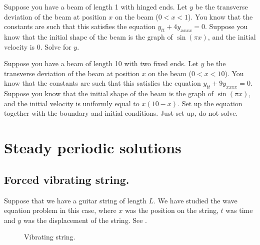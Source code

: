 \documentclass[12pt]{book}
\begin{document}
\setcounter{exercise}{100}

\begin{exercise}
Suppose you have a beam of length 1 with hinged ends.  Let $y$ be the
transverse deviation of the beam at position $x$ on the beam ($0 < x < 1$).
You know that the
constants are such that this satisfies the equation $y_{tt} + 4 y_{xxxx} =
0$.   Suppose you know that the initial shape of the beam is the graph of
$\sin (\pi x)$, and the initial velocity is 0.  Solve for $y$.
\end{exercise}

\begin{exercise}
Suppose you have a beam of length 10 with two fixed ends.  Let $y$ be the
transverse deviation of the beam at position $x$ on the beam ($0 < x < 10$).
You know that the
constants are such that this satisfies the equation $y_{tt} + 9 y_{xxxx} =
0$.   Suppose you know that the initial shape of the beam is the graph of
$\sin(\pi x)$, and the initial velocity is uniformly equal to $x(10-x)$.
Set up the equation together with the
boundary and initial conditions.  Just set up, do not solve.
\end{exercise}


\sectionnewpage
\section{Steady periodic solutions}


\subsection{Forced vibrating string.}

Suppose that we have a guitar string of length $L$.  We have studied the
wave equation problem in this case, where $x$ was the position on the string,
$t$ was time and $y$ was the displacement of the string.  See
.

\begin{figure}[h!t]
\capstart
\begin{center}
\caption{Vibrating string.\label{sps:vibstrfig}}
\end{center}
\end{figure}
\end{document}
